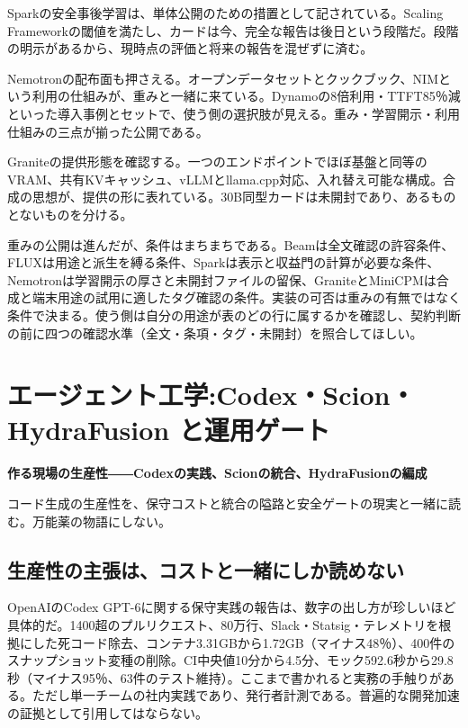 \documentclass[lualatex,a4paper,10pt]{jlreq}
\begin{document}
Sparkの安全事後学習は、単体公開のための措置として記されている。Scaling Frameworkの閾値を満たし、カードは今、完全な報告は後日という段階だ。段階の明示があるから、現時点の評価と将来の報告を混ぜずに済む。
\cite{B13,B14,B15}


Nemotronの配布面も押さえる。オープンデータセットとクックブック、NIMという利用の仕組みが、重みと一緒に来ている。Dynamoの8倍利用・TTFT85％減といった導入事例とセットで、使う側の選択肢が見える。重み・学習開示・利用仕組みの三点が揃った公開である。
\cite{B20,B21,B22}


Graniteの提供形態を確認する。一つのエンドポイントでほぼ基盤と同等のVRAM、共有KVキャッシュ、vLLMとllama.cpp対応、入れ替え可能な構成。合成の思想が、提供の形に表れている。30B同型カードは未開封であり、あるものとないものを分ける。
\cite{B23,B24,B25}


重みの公開は進んだが、条件はまちまちである。Beamは全文確認の許容条件、FLUXは用途と派生を縛る条件、Sparkは表示と収益門の計算が必要な条件、Nemotronは学習開示の厚さと未開封ファイルの留保、GraniteとMiniCPMは合成と端末用途の試用に適したタグ確認の条件。実装の可否は重みの有無ではなく条件で決まる。使う側は自分の用途が表のどの行に属するかを確認し、契約判断の前に四つの確認水準（全文・条項・タグ・未開封）を照合してほしい。
\cite{B20,B21,B28,B23,B26,B29,B30,B24,B25,B13,B27,B16,B17,B18,B19,B14,B22,B15}


\section{エージェント工学:Codex・Scion・HydraFusion と運用ゲート}
\label{sec:P4}

{\Large\bfseries 作る現場の生産性――Codexの実践、Scionの統合、HydraFusionの編成\par}
\smallskip
{\color{SurveyMuted}コード生成の生産性を、保守コストと統合の隘路と安全ゲートの現実と一緒に読む。万能薬の物語にしない。\par}
\bigskip

\subsection*{生産性の主張は、コストと一緒にしか読めない}

OpenAIのCodex GPT-6に関する保守実践の報告は、数字の出し方が珍しいほど具体的だ。1400超のプルリクエスト、80万行、Slack・Statsig・テレメトリを根拠にした死コード除去、コンテナ3.31GBから1.72GB（マイナス48％）、400件のスナップショット変種の削除。CI中央値10分から4.5分、モック592.6秒から29.8秒（マイナス95％、63件のテスト維持）。ここまで書かれると実務の手触りがある。ただし単一チームの社内実践であり、発行者計測である。普遍的な開発加速の証拠として引用してはならない。
\cite{B31}
\end{document}

